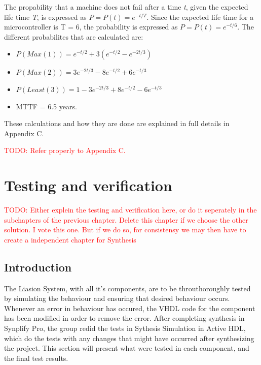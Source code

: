 \documentclass[a4paper]{IEEEtran}
\newcommand\TODO[1]{\textcolor{red}{TODO:#1}}
\newcommand\todo[1]{\TODO{#1}}
\begin{document}
The propability that a machine does not fail after a time \textit{t}, given the expected life time \textit{T}, is expressed as $P = P(t) = e^{-t/T}$.
Since the expected life time for a microcontroller is T = 6, the probability is expressed as $P = P(t) = e^{-t/6}$. 
The different probabilites that are calculated are:
\begin{itemize}
    \item $P(Max(1)) = e^{-t/2}+3(e^{-t/2}-e^{-2t/3})$
    \item $P(Max(2)) = 3e^{-2t/3}-8e^{-t/2}+6e^{-t/3}$
    \item $P(Least(3)) = 1-3e^{-2t/3}+8e^{-t/2}-6e^{-t/3}$
    \item MTTF = 6.5 years.
\end{itemize}

These calculations and how they are done are explained in full details in Appendix C.

\todo{ Refer properly to Appendix C.}

\section{ Testing and verification }
\todo{ Either explein the testing and verification here, or do it seperately in the subchapters of the previous chapter. Delete this chapter if we choose the other solution. I vote this one. But if we do so, for consistensy we may then have to create a independent chapter for Synthesis }
\subsection{ Introduction}
The Liasion System, with all it's components, are to be throuthoroughly tested by simulating the behaviour and ensuring that desired behaviour occurs.
Whenever an error in behaviour has occured, the VHDL code for the component has been modified in order to remove the error.
After completing synthesis in Synplify Pro, the group redid the tests in Sythesis Simulation in Active HDL, which do the tests with any changes that might have occurred after synthesizing the project. 
This section will present what were tested in each component, and the final test results.
\end{document}

